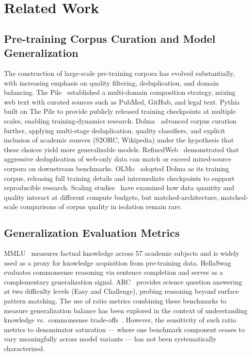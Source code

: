 \section{Related Work}

\subsection{Pre-training Corpus Curation and Model Generalization}

The construction of large-scale pre-training corpora has evolved substantially, with increasing emphasis on quality filtering, deduplication, and domain balancing. The Pile~\cite{Gao2020Pile} established a multi-domain composition strategy, mixing web text with curated sources such as PubMed, GitHub, and legal text. Pythia~\cite{Biderman2023Pythia} built on The Pile to provide publicly released training checkpoints at multiple scales, enabling training-dynamics research. Dolma~\cite{Soldaini2024Dolma} advanced corpus curation further, applying multi-stage deduplication, quality classifiers, and explicit inclusion of academic sources (S2ORC, Wikipedia) under the hypothesis that these choices yield more generalizable models. RefinedWeb~\cite{Penedo2023RefinedWeb} demonstrated that aggressive deduplication of web-only data can match or exceed mixed-source corpora on downstream benchmarks. OLMo~\cite{Groeneveld2024OLMo} adopted Dolma as its training corpus, releasing full training details and intermediate checkpoints to support reproducible research. Scaling studies~\cite{Muennighoff2023Scaling} have examined how data quantity and quality interact at different compute budgets, but matched-architecture, matched-scale comparisons of corpus quality in isolation remain rare.

\subsection{Generalization Evaluation Metrics}

MMLU~\cite{Hendrycks2021MMLU} measures factual knowledge across 57 academic subjects and is widely used as a proxy for knowledge acquisition from pre-training data. HellaSwag~\cite{Zellers2019HellaSwag} evaluates commonsense reasoning via sentence completion and serves as a complementary generalization signal. ARC~\cite{Clark2018ARC} provides science question answering at two difficulty levels (Easy and Challenge), probing reasoning beyond surface pattern matching. The use of ratio metrics combining these benchmarks to measure generalization balance has been explored in the context of understanding knowledge vs.\ commonsense trade-offs~\cite{Miller2021Accuracy,Koh2021WILDS}. However, the sensitivity of such ratio metrics to denominator saturation --- where one benchmark component ceases to vary meaningfully across model variants --- has not been systematically characterized.

